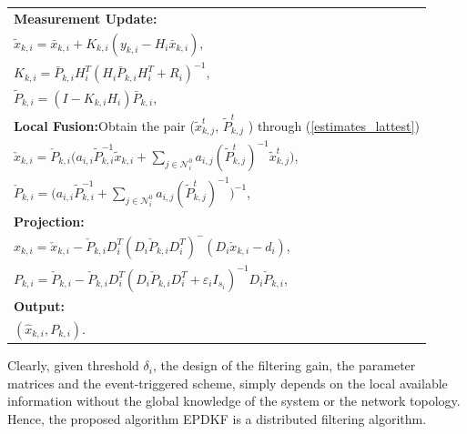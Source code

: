 \documentclass[journal,transmag]{IEEEtran}
\newtheorem{remark}{\textbf{Remark}}
\begin{document}
{\begin{table}[htp]
\begin{tabular}{l}
			\textbf{Measurement Update:}\\
			$\tilde x_{k,i}=\bar x_{k,i}+K_{k,i}(y_{k,i}-H_{i}\bar x_{k,i}),$\\        %
			$K_{k,i}=\bar P_{k,i}H_{i}^T(H_{i}\bar P_{k,i}H_{i}^T+R_{i})^{-1},$\\
			$\tilde P_{k,i}=(I-K_{k,i}H_{i})\bar P_{k,i}$,\\
			\textbf{Local Fusion:}Obtain the pair ($\tilde x_{k,j}^t$, $\tilde P_{k,j}^t$ ) through  (\ref{estimates_lattest})\\
			$\check x_{k,i}=\check P_{k,i}\bigg(a_{i,i}\tilde P_{k,i}^{-1}\tilde x_{k,i}+\sum_{j\in \mathcal{N}_{i}^0}a_{i,j} (\tilde P_{k,j}^t)^{-1}\tilde x_{k,j}^t\bigg)$,\\	
			$\check P_{k,i}=\bigg(a_{i,i}\tilde P_{k,i}^{-1}+\sum_{j\in \mathcal{N}_{i}^0}a_{i,j}  (\tilde P_{k,j}^t)^{-1}\bigg)^{-1}$,	\\
			\textbf{Projection:}\\
			$\hat x_{k,i}=\check x_{k,i}-\check P_{k,i}D_{i}^T(D_{i}\check P_{k,i}D_{i}^T)^{-}(D_{i}\check x_{k,i}-d_{i}),$\\
			$P_{k,i}=\check P_{k,i}-\check P_{k,i}D_{i}^T(D_{i}\check P_{k,i}D_{i}^T+\varepsilon_i I_{s_i})^{-1}D_{i}\check P_{k,i}$,\\	
			\textbf{Output:}\\	
			$(\hat x_{k,i},P_{k,i})$.	\\
			\hline
		\end{tabular}
	\end{table}
	
	Clearly, given threshold $\delta_{i}$, the design of the filtering gain, the parameter matrices and the event-triggered scheme, simply depends  on the local available information without the global knowledge of the system or the network topology.  Hence, the proposed algorithm EPDKF is a distributed filtering algorithm.
	

}
\end{document}

